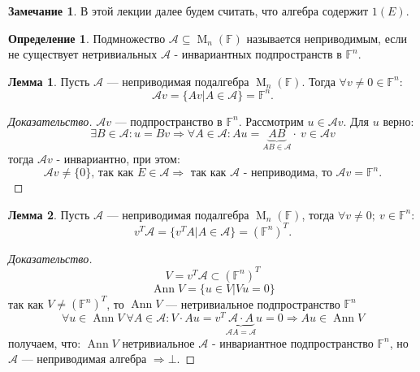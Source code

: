 \documentclass[a4paper, 14pt]{extarticle}
\theoremstyle{definition}
\newtheorem{definition}{Определение}
\newtheorem{note}{Замечание}
\newtheorem{lemma}{Лемма}
\begin{document}
\begin{note}
	В этой лекции далее будем считать, что алгебра содержит \(1(E)\).
\end{note}

\begin{definition}
	Подмножество \(\mathcal{A} \subseteq \operatorname{M}_n(\mathbb{F})\) называется неприводимым, если не существует нетривиальных \(\mathcal{A}\) - инвариантных подпространств в \(\mathbb{F}^n\).
\end{definition}

\begin{lemma} \label{lm2_1}
	Пусть \(\mathcal{A}\) --- неприводимая подалгебра \(\operatorname{M}_n(\mathbb{F})\). Тогда \(\forall v \neq 0 \in \mathbb{F}^n :\) \[\mathcal{A}v = \{Av | A \in \mathcal{A}\} = \mathbb{F}^n.\]
\end{lemma}

\begin{proof}[Доказательство]
	\(\mathcal{A}v\) --- подпространство в \(\mathbb{F}^n\). Рассмотрим \(u \in \mathcal{A}v\). Для \(u\) верно: \[\exists B \in \mathcal{A}: u = Bv \Rightarrow \forall A \in \mathcal{A} : Au = \underbrace{AB}_{AB \in \mathcal{A}} \cdot\ v \in \mathcal{A}v\]
	тогда \(\mathcal{A}v\) - инвариантно, при этом:
	\[\mathcal{A}v \neq \{0\} \text{, так как \(E \in \mathcal{A} \Rightarrow\) так как \(\mathcal{A}\) - неприводима, то } \mathcal{A}v = \mathbb{F}^n.\]
\end{proof}

\begin{lemma} \label{lm2_2}
	Пусть \(\mathcal{A}\) --- неприводимая подалгебра \(\operatorname{M}_n(\mathbb{F})\), тогда \(\forall v \neq 0;\ v \in \mathbb{F}^n : \)
	\[v^T\mathcal{A} = \{v^TA | A \in \mathcal{A}\} = (\mathbb{F}^n)^T.\]
\end{lemma}

\begin{proof}[Доказательство]
	\[V = v^T\mathcal{A} \subset (\mathbb{F}^n)^T\]
	\[\operatorname{Ann}V = \{u \in V | Vu = 0\}\]
	так как \(V \neq (\mathbb{F}^n)^T\), то \(\operatorname{Ann}V\) --- нетривиальное подпространство \(\mathbb{F}^n\)
	\[\forall u \in \operatorname{Ann}V\ \forall A \in \mathcal{A}: V \cdot Au = v^T \underbrace{\mathcal{A} \cdot A}_{\mathcal{A}A = \mathcal{A}}u = 0 \Rightarrow Au \in \operatorname{Ann}V\]
	получаем, что: \(\operatorname{Ann}V\) нетривиальное \(\mathcal{A}\) - инвариантное подпространство \(\mathbb{F}^n\), но \(\mathcal{A}\) --- неприводимая алгебра \(\Rightarrow \bot\).
\end{proof}
\end{document}
